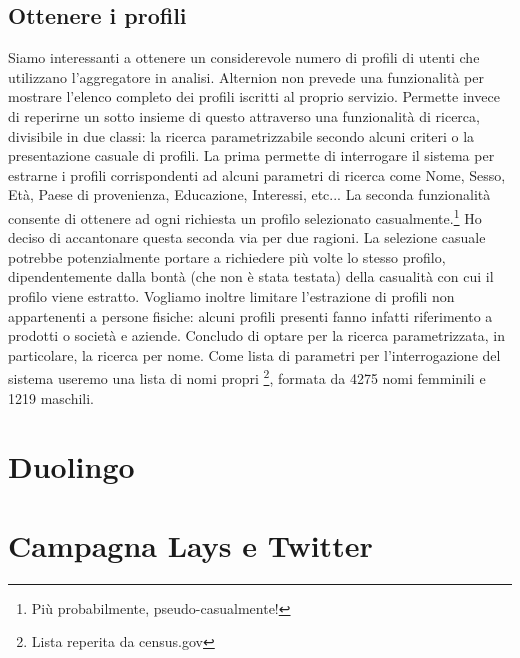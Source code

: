 \subsection{Ottenere i profili}
Siamo interessanti a ottenere un considerevole numero di profili di utenti che utilizzano l'aggregatore in analisi. Alternion non prevede una funzionalità per mostrare l'elenco completo dei profili iscritti al proprio servizio. Permette invece di reperirne un sotto insieme di questo attraverso una funzionalità di ricerca, divisibile in due classi: la ricerca parametrizzabile secondo alcuni criteri o la presentazione casuale di profili. La prima permette di interrogare il sistema per estrarne i profili corrispondenti ad alcuni parametri di ricerca come Nome, Sesso, Età, Paese di provenienza, Educazione, Interessi, etc... La seconda funzionalità consente di ottenere ad ogni richiesta un profilo selezionato casualmente.\footnote{Più probabilmente, pseudo-casualmente!} Ho deciso di accantonare questa seconda via per due ragioni. La selezione casuale potrebbe potenzialmente portare a richiedere più volte lo stesso profilo, dipendentemente dalla bontà (che non è stata testata) della casualità con cui il profilo viene estratto. Vogliamo inoltre limitare l'estrazione di profili non appartenenti a persone fisiche: alcuni profili presenti fanno infatti riferimento a prodotti o società e aziende. Concludo di optare per la ricerca parametrizzata, in particolare, la ricerca per nome. Come lista di parametri per l'interrogazione del sistema useremo una lista di nomi propri \footnote{Lista reperita da census.gov}, formata da 4275 nomi femminili e 1219 maschili.


\section{Duolingo}
\section{Campagna Lays e Twitter}
